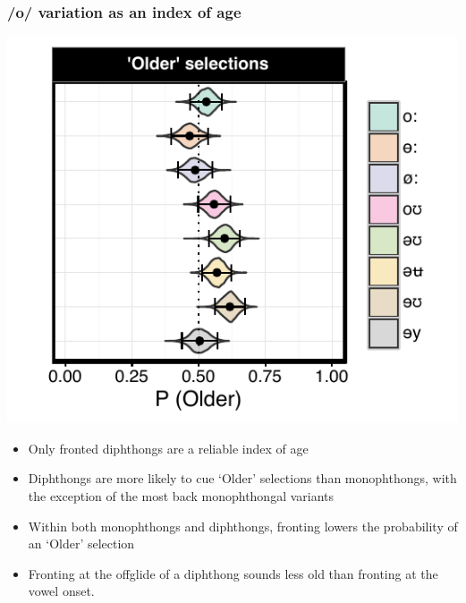 \documentclass[a0,final]{a0poster}
\begin{document}
\begin{multicols*}{4}
\subsubsection*{/o/ variation as an index of age}
\vspace*{-.5cm}
\begin{minipage}{0.13\textwidth}
\hspace*{-1.4cm}
\includegraphics[scale=2.2]{ow_age_effects.pdf}
\end{minipage}
\hspace*{1.75cm}
\begin{minipage}{0.1\textwidth}
\vspace*{1cm}
\raggedright
\begin{itemize}
\item{Only fronted diphthongs are a reliable index of age}
\item{Diphthongs are more likely to cue `Older' selections than monophthongs, with the exception of the most back monophthongal variants}
\item{Within both monophthongs and diphthongs, fronting lowers the probability of an `Older' selection}
\item{Fronting at the offglide of a diphthong sounds less old than fronting at the vowel onset.}
\end{itemize}
\end{minipage}
\vspace*{-1.75cm}

\end{multicols*}
\end{document}
